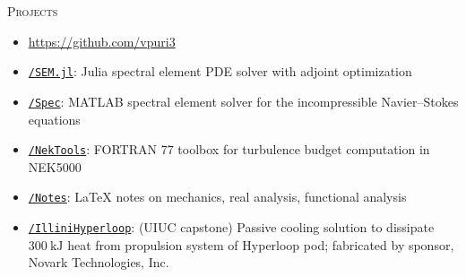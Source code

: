 \documentclass[10pt]{article}
\begin{document}
\begin{multicols}{2}
\textsc{Projects}
\columnbreak

\vspace{-1.75em}
\begin{itemize}[label=-]
    \setlength{\itemindent}{-1.50em}
    \setlength\itemsep{-0.25em}
    \item[]\hspace{-1.00em}\url{https://github.com/vpuri3}
     \item \href{https://github.com/vpuri3/SEM.jl}{\texttt{/SEM.jl}}: Julia spectral element PDE solver with adjoint optimization
    \item \href{https://github.com/vpuri3/Spec}{\texttt{/Spec}}: MATLAB spectral element solver for the incompressible Navier--Stokes equations
    \item \href{https://github.com/vpuri3/NekTools}{\texttt{/NekTools}}: FORTRAN 77 toolbox for turbulence budget computation in NEK5000
    \item \href{https://github.com/vpuri3/Notes}{\texttt{/Notes}}: \LaTeX{} notes on mechanics, real analysis, functional analysis
    \item \href{https://github.com/vpuri3/IlliniHyperloop}{\texttt{/IlliniHyperloop}}: (UIUC capstone) Passive cooling solution to dissipate $\SI{300}{\kilo \joule}$ heat from propulsion system of Hyperloop pod; fabricated by sponsor, Novark Technologies, Inc.
\end{itemize}
\vspace{-2.0em}

\end{multicols}
\vspace{-1.5em}
\vfill
\end{document}
